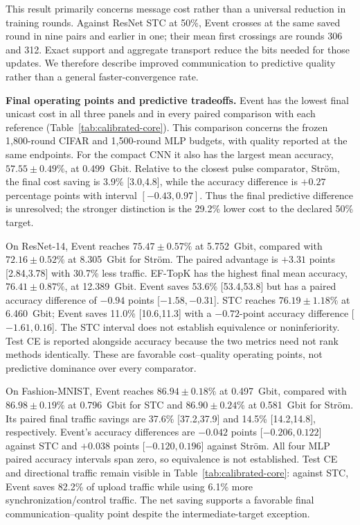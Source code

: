 \documentclass[conference]{IEEEtran}
\newcommand{\coreColor}{\color{coreblue}}
\newcommand{\coreRev}[1]{{\coreColor #1}}
\newcommand{\mlpColor}{\color{mlporange}}
\newcommand{\mlpRev}[1]{{\mlpColor #1}}
\begin{document}
\coreRev{This result primarily concerns message cost rather than a universal
reduction in training rounds. Against ResNet STC at 50\%, Event crosses at the
same saved round in nine pairs and earlier in one; their mean first crossings
are rounds 306 and 312. Exact support and aggregate transport reduce the bits
needed for those updates. We therefore describe improved communication to
predictive quality rather than a general faster-convergence rate.}

\mlpRev{\textbf{Final operating points and predictive tradeoffs.}
Event has the lowest final unicast cost in all three panels and in every
paired comparison with each reference (Table~\ref{tab:calibrated-core}).
This comparison concerns the frozen 1,800-round CIFAR and 1,500-round MLP
budgets, with quality reported at the same endpoints.}
\coreRev{
For the compact CNN it also has the largest mean accuracy, $57.55\pm0.49\%$,
at 0.499~Gbit. Relative to the closest pulse comparator, Str\"om, the final
cost saving is 3.9\% [3.0,4.8], while the accuracy difference is
$+0.27$ percentage points with interval $[-0.43,0.97]$.
Thus the final predictive difference is unresolved; the stronger distinction
is the 29.2\% lower cost to the declared 50\% target.}

\coreRev{On ResNet-14, Event reaches $75.47\pm0.57\%$ at 5.752~Gbit,
compared with $72.16\pm0.52\%$ at 8.305~Gbit for Str\"om.
The paired advantage is $+3.31$ points [2.84,3.78] with 30.7\% less traffic.
EF-TopK has the highest final mean accuracy, $76.41\pm0.87\%$,
at 12.389~Gbit. Event saves 53.6\% [53.4,53.8] but has a paired accuracy
difference of $-0.94$ points [$-1.58,-0.31$].
STC reaches $76.19\pm1.18\%$ at 6.460~Gbit; Event saves 11.0\% [10.6,11.3]
with a $-0.72$-point accuracy difference [$-1.61,0.16$].
The STC interval does not establish equivalence or noninferiority.
Test CE is reported alongside accuracy because the two metrics need not rank
methods identically. These are favorable cost--quality operating points,
not predictive dominance over every comparator.}

\mlpRev{On Fashion-MNIST, Event reaches $86.94\pm0.18\%$ at 0.497~Gbit,
compared with $86.98\pm0.19\%$ at 0.796~Gbit for STC and
$86.90\pm0.24\%$ at 0.581~Gbit for Str\"om.
Its paired final traffic savings are 37.6\% [37.2,37.9] and
14.5\% [14.2,14.8], respectively. Event's accuracy differences are
$-0.042$ points [$-0.206,0.122$] against STC and $+0.038$ points
[$-0.120,0.196$] against Str\"om. All four MLP paired accuracy intervals span
zero, so equivalence is not established. Test CE and directional traffic remain
visible in Table~\ref{tab:calibrated-core}: against STC, Event saves 82.2\%
of upload traffic while using 6.1\% more synchronization/control traffic.
The net saving supports a favorable final communication--quality point despite
the intermediate-target exception.}
\end{document}
